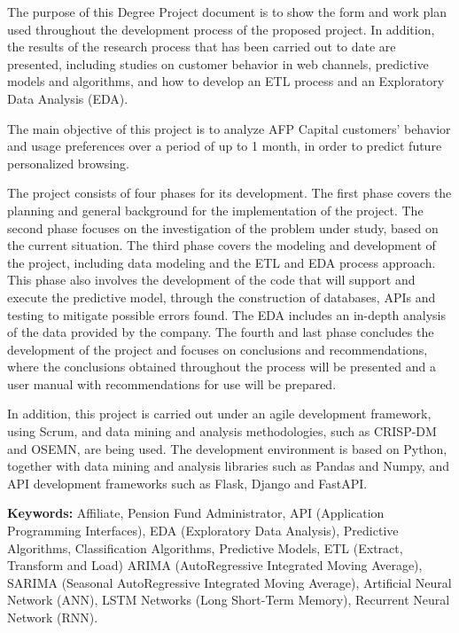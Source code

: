 The purpose of this Degree Project document is to show the form and work plan used throughout the development process of the proposed project. In addition, the results of the research process that has been carried out to date are presented, including studies on customer behavior in web channels, predictive models and algorithms, and how to develop an ETL process and an Exploratory Data Analysis (EDA).

The main objective of this project is to analyze AFP Capital customers' behavior and usage preferences over a period of up to 1 month, in order to predict future personalized browsing.

The project consists of four phases for its development. The first phase covers the planning and general background for the implementation of the project. The second phase focuses on the investigation of the problem under study, based on the current situation. The third phase covers the modeling and development of the project, including data modeling and the ETL and EDA process approach. This phase also involves the development of the code that will support and execute the predictive model, through the construction of databases, APIs and testing to mitigate possible errors found. The EDA includes an in-depth analysis of the data provided by the company. The fourth and last phase concludes the development of the project and focuses on conclusions and recommendations, where the conclusions obtained throughout the process will be presented and a user manual with recommendations for use will be prepared.

In addition, this project is carried out under an agile development framework, using Scrum, and data mining and analysis methodologies, such as CRISP-DM and OSEMN, are being used. The development environment is based on Python, together with data mining and analysis libraries such as Pandas and Numpy, and API development frameworks such as Flask, Django and FastAPI.

\textbf{Keywords:} Affiliate, Pension Fund Administrator, API (Application Programming Interfaces), EDA (Exploratory Data Analysis), Predictive Algorithms, Classification Algorithms, Predictive Models, ETL (Extract, Transform and Load) ARIMA (AutoRegressive Integrated Moving Average), SARIMA (Seasonal AutoRegressive Integrated Moving Average), Artificial Neural Network (ANN), LSTM Networks (Long Short-Term Memory), Recurrent Neural Network (RNN).
